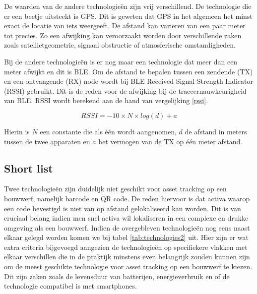 De waarden van de andere technologieën zijn vrij verschillend. De technologie die er een beetje uitsteekt is GPS. Dit is geweten dat GPS in het algemeen het minst exact de locatie van iets weergeeft. De afstand kan variëren van een paar meter tot precies. Zo een afwijking kan veroorzaakt worden door verschillende zaken zoals satellietgeometrie, signaal obstructie of atmosferische omstandigheden.

Bij de andere technologieën is er nog maar een technologie dat meer dan een meter afwijkt en dit is BLE. Om de afstand te bepalen tussen een zendende (TX) en een ontvangende (RX) node wordt bij BLE Received Signal Strength Indicator (RSSI) gebruikt. Dit is de reden voor de afwijking bij de traceernauwkeurigheid van BLE. RSSI wordt berekend aan de hand van vergelijking \ref{rssi}.

\begin{equation}
    \label{rssi}
    RSSI=−10×N×log(d)+a
\end{equation}

Hierin is $N$ een constante die als één wordt aangenomen, $d$ de afstand in meters tussen de twee apparaten en $a$ het vermogen van de TX op één meter afstand.

\subsection{Short list}
Twee technologieën zijn duidelijk niet geschikt voor asset tracking op een bouwwerf, namelijk barcode en QR code. De reden hiervoor is dat activa waarop een code bevestigd is niet van op afstand gelokaliseerd kan worden. Dit is van cruciaal belang indien men snel activa wil lokaliseren in een complexe en drukke omgeving als een bouwwerf. Indien de overgebleven technologieën nog eens naast elkaar gelegd worden komen we bij tabel \ref{tab:technologies2} uit. Hier zijn er wat extra criteria bijgevoegd aangezien de technologieën op specifiekere vlakken met elkaar verschillen die in de praktijk minstens even belangrijk zouden kunnen zijn om de meest geschikte technologie voor asset tracking op een bouwwerf te kiezen. Dit zijn zaken zoals de levensduur van batterijen, energieverbruik en of de technologie compatibel is met smartphones. 

